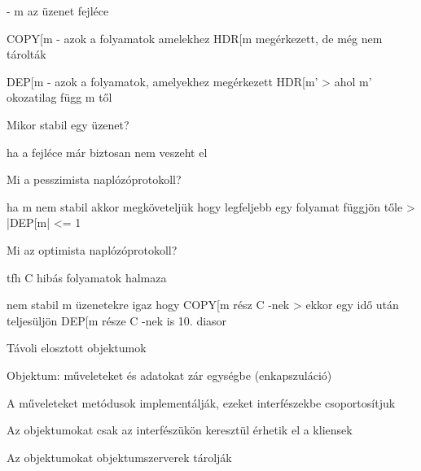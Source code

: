 \documentclass[twoside, a4paper, 12pt]{article}
\begin{document}
\begin{description}
                                            - m az üzenet fejléce 
                                        \item COPY[m
                                                - azok a folyamatok amelekhez HDR[m megérkezett, de még nem tárolták
                                                \item DEP[m
                                                        - azok a folyamatok, amelyekhez megérkezett HDR[m' 
                                                            > ahol m' okozatilag függ m től
                                                        \item  Mikor stabil egy üzenet?
                                                        \item ha a fejléce már biztosan nem veszeht el
                                                        \item  Mi a pesszimista naplózóprotokoll?
                                                        \item ha m nem stabil akkor megköveteljük hogy legfeljebb egy folyamat függjön tőle
                                                            > |DEP[m| <= 1
                                                            \item  Mi az optimista naplózóprotokoll?
                                                            \item tfh C hibás folyamatok halmaza
                                                            \item nem stabil m üzenetekre igaz hogy COPY[m rész C -nek
                                                                    > ekkor egy idő után teljesüljön DEP[m része C -nek  is 
                                                                        10. diasor
                                                                    \item  Távoli elosztott objektumok
                                                                    \item Objektum: műveleteket és adatokat zár egységbe (enkapszuláció)
                                                                    \item A műveleteket metódusok implementálják, ezeket interfészekbe csoportosítjuk
                                                                    \item Az objektumokat csak az interfészükön keresztül érhetik el a kliensek
                                                                    \item Az objektumokat objektumszerverek tárolják

\end{description}
\end{document}
